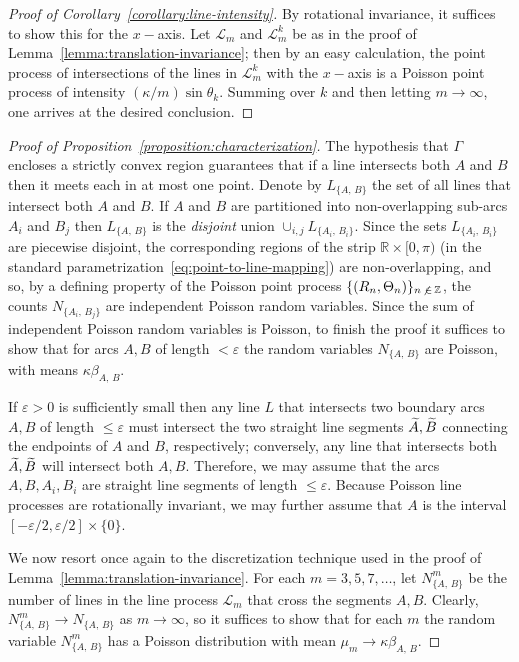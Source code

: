 \documentclass[10pt]{amsart}
\theoremstyle{definition}\newtheorem{defi}[theo]{Definition}\newtheorem{rema}[theo]{Remark}\newtheorem{exam}[theo]{Example}\newtheorem{exem}[theo]{Example}\newtheorem{nota}[theo]{Notation}
\newcommand{\zz}[1]{\mathbb #1}
\let\oldtilde\tilde
\renewcommand*{\tilde}[1]{\mathchoice{\widetilde{#1}}{\widetilde{#1}}{\oldtilde{#1}}{\oldtilde{#1}}}\let\oldforall\forall
\renewcommand*{\forall}{\mathrel{\oldforall}}
\begin{document}
\begin{proof}
[Proof of Corollary~\ref{corollary:line-intensity}]
By rotational invariance, it suffices to show this for the $x-$axis. Let $\mathcal{L}_{m}$ and $\mathcal{L}^{k}_{m}$ be as in the proof of Lemma~\ref{lemma:translation-invariance}; then by an easy calculation, the point process of intersections of the lines in $\mathcal{L}^{k}_{m}$ with the $x-$axis is a Poisson point process of intensity $(\kappa / m) \sin \theta_{k}$. Summing over $k$ and then letting $m \rightarrow \infty$, one arrives at the desired conclusion.
\end{proof}


\begin{proof}
[Proof of Proposition~\ref{proposition:characterization}]
The hypothesis that $\Gamma$ encloses a strictly convex region guarantees that if a line intersects both $A$ and $B$ then it meets each in at most one point. Denote by $L_{\{A,\,B\}}$ the set of all lines that intersect both $A$ and $B$. If $A$ and $B$ are partitioned into non-overlapping sub-arcs $A_{i}$ and $B_{j}$ then $L_{\{A,\,B\}}$ is the \emph{disjoint} union $\cup_{i,j}L_{\{A_{i},\,B_{i}\}}$. Since the sets $L_{\{A_{i},\,B_{i}\}}$ are piecewise disjoint, the corresponding regions of the strip $\zz{R}\times [0,\pi)$ (in the standard parametrization~\eqref{eq:point-to-line-mapping}) are non-overlapping, and so, by a defining property of the Poisson point process $\{(R_{n},\Theta_{n}) \}_{n\,\not\,\in\,\zz{Z}}$, the counts $N_{\{A_{i},\,B_{j}\}}$ are independent Poisson random variables. Since the sum of independent Poisson random variables is Poisson, to finish the proof it suffices to show that for arcs $A,B$ of length $<\varepsilon$ the random variables $N_{\{A,\,B\}}$ are Poisson, with means $\kappa \beta_{A,\,B}$.

If $\varepsilon >0$ is sufficiently small then any line $L$ that intersects two boundary arcs $A,B$ of length $\leq \varepsilon$ must intersect the two straight line segments $\tilde{A},\tilde{B}$ connecting the endpoints of $A$ and $B$, respectively; conversely, any line that intersects both $\tilde{A},\tilde{B}$ will intersect both $A,B$. Therefore, we may assume that the arcs $A,B,A_{i},B_{i}$ are straight line segments of length $\leq \varepsilon$. Because Poisson line processes are rotationally invariant, we may further assume that $A$ is the interval $[-\varepsilon /2,\varepsilon /2]\times \{0 \}$.

We now resort once again to the discretization technique used in the proof of Lemma~\ref{lemma:translation-invariance}. For each $m=3,5,7,\dotsc$, let $N^{m}_{\{A,\,B\}}$ be the number of lines in the line process $\mathcal{L}_{m}$ that cross the segments $A,B$. Clearly, $N^{m}_{\{A,\,B\}}\rightarrow N_{\{A,\,B\}}$ as $m \rightarrow \infty$, so it suffices to show that for each $m$ the random variable $N^{m}_{\{A,\,B\}}$ has a Poisson distribution with mean $\mu_{m}\rightarrow \kappa
\beta_{A,\,B}$.


\end{proof}
\end{document}
